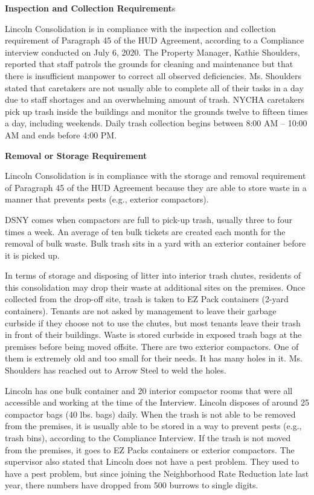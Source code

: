


\textbf{Inspection and Collection Requirement}s 

Lincoln Consolidation is in compliance with the inspection and collection requirement of Paragraph 45 of the HUD Agreement, according to a Compliance interview conducted on July 6, 2020. The Property Manager, Kathie Shoulders, reported that staff patrols the grounds for cleaning and maintenance but that  there is insufficient manpower to correct all observed deficiencies. Ms. Shoulders stated that caretakers are not usually able to complete all of their tasks in a day due to staff shortages and an overwhelming amount of trash.  NYCHA caretakers pick up trash inside the buildings and monitor the grounds twelve to fifteen times a day, including weekends. Daily trash collection begins between 8:00 AM -- 10:00 AM and ends before 4:00 PM. 

 

\textbf{Removal or Storage Requirement} 

Lincoln Consolidation is in compliance with the storage and removal requirement of Paragraph 45 of the HUD Agreement because they are able to store waste in a manner that prevents pests (e.g., exterior compactors).



DSNY comes when compactors are full to pick-up trash, usually three to four times a week. An average of ten bulk tickets are created each month for the removal of bulk waste. Bulk trash sits in a yard with an exterior container before it is picked up.  

 

In terms of storage and disposing of litter into interior trash chutes, residents of this consolidation may drop their waste at additional sites on the premises. Once collected from the drop-off site, trash is taken to EZ Pack containers (2-yard containers). Tenants are not asked by management to leave their garbage curbside if they choose not to use the chutes, but most tenants leave their trash in front of their buildings. Waste is stored curbside in exposed trash bags at the premises before being moved offsite. There are two exterior compactors. One of them is extremely old and too small for their needs. It has many holes in it. Ms. Shoulders has reached out to Arrow Steel to weld the holes. 

 

Lincoln has one bulk container and 20 interior compactor rooms that were all accessible and working at the time of the Interview. Lincoln disposes of around 25 compactor bags (40 lbs. bags) daily. When the trash is not able to be removed from the premises, it is  usually able to be stored in a way to prevent pests (e.g., trash bins), according to the Compliance Interview. If the trash is not moved from the premises, it goes to EZ Packs containers or exterior compactors. The supervisor also stated that Lincoln does not have a pest problem. They used to have a pest problem, but since joining the Neighborhood Rate Reduction late last year, there numbers have dropped from 500 burrows to single digits.  



